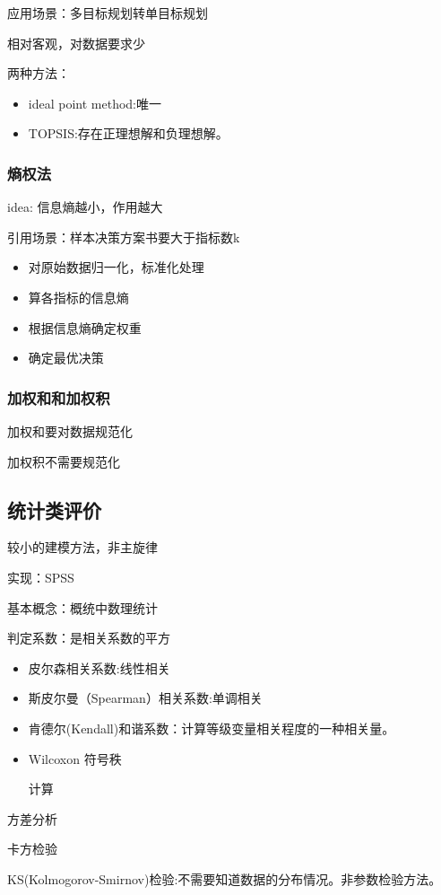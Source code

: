 \documentclass[12pt,a4paper]{article}
\begin{document}
应用场景：多目标规划转单目标规划

相对客观，对数据要求少

两种方法：
\begin{itemize}
  \item ideal point method:唯一
  \item TOPSIS:存在正理想解和负理想解。
\end{itemize}

\subsubsection{熵权法}
idea: 信息熵越小，作用越大

引用场景：样本决策方案书要大于指标数k

\begin{itemize}
  \item 对原始数据归一化，标准化处理
  \item 算各指标的信息熵
  \item 根据信息熵确定权重
  \item 确定最优决策
\end{itemize}

\subsubsection{加权和和加权积}
加权和要对数据规范化

加权积不需要规范化
\subsection{统计类评价}
较小的建模方法，非主旋律

实现：SPSS

基本概念：概统中数理统计

判定系数：是相关系数的平方

\begin{itemize}
  \item 皮尔森相关系数:线性相关
  \item 斯皮尔曼（Spearman）相关系数:单调相关
  \item 肯德尔(Kendall)和谐系数：计算等级变量相关程度的一种相关量。
  \item Wilcoxon 符号秩

  计算
\end{itemize}

方差分析

卡方检验

KS(Kolmogorov-Smirnov)检验:不需要知道数据的分布情况。非参数检验方法。
\end{document}
